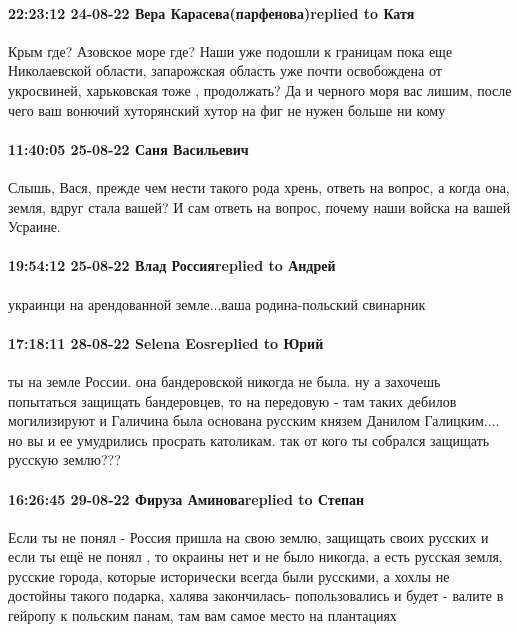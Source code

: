 \paragraph{22:23:12 24-08-22 Вера Карасева(парфенова)replied to Катя}

Крым где? Азовское море где? Наши уже подошли к границам пока еще Николаевской
области, запарожская область уже почти освобождена от укросвиней, харьковская
тоже , продолжать? Да и черного моря вас лишим, после чего ваш вонючий
хуторянский хутор на фиг не нужен больше ни кому

\paragraph{11:40:05 25-08-22 Саня Васильевич}

Слышь, Вася, прежде чем нести такого рода хрень, ответь на вопрос, а когда она,
земля, вдруг стала вашей? И сам ответь на вопрос, почему наши войска на вашей
Усраине.

\paragraph{19:54:12 25-08-22 Влад Россияreplied to Андрей}

украинци на арендованной земле...ваша родина-польский свинарник

\paragraph{17:18:11 28-08-22 Selena Eosreplied to Юрий}

ты на земле России. она бандеровской никогда не была. ну а захочешь попытаться защищать бандеровцев, то на передовую - там таких дебилов могилизируют   
и Галичина была основана русским князем  Данилом Галицким....  но вы и ее умудрились просрать католикам.
так от кого ты собрался защищать русскую землю???

\paragraph{16:26:45 29-08-22 Фируза Аминоваreplied to Степан}

Если ты не понял - Россия пришла на свою землю, защищать своих русских и если
ты ещё не понял , то окраины нет и не было никогда, а есть русская земля,
русские города, которые исторически всегда были русскими, а хохлы не достойны
такого подарка, халява закончилась- попользовались и будет - валите в гейропу к
польским панам, там вам самое место на плантациях

